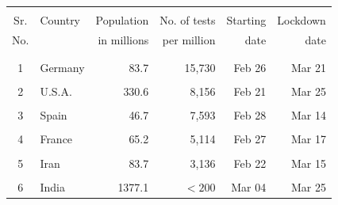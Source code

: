 \documentclass[aps,prd,10pt,twocolumn,nofootinbib]{revtex4-2}
\begin{document}
\begin{table}
\begin{tabular}
 {c l r r r r } 
\hline 
\hline
 &  &  &  &  &  \\ 
Sr.  & Country & Population & No. of tests & Starting  & Lockdown \\ 
No. &  & in millions & per million & date & date \\ 
 &  &  &  &  &  \\ 
\hline
\hline 
 &  &  &  &  &  \\ 
1 & Germany & 83.7 & 15,730 & Feb 26 & Mar 21  \\ 
 &  &  &  &  &  \\ 
2 & U.S.A. & 330.6 & 8,156 & Feb 21 & Mar 25  \\ 
 &  &  &  &  &  \\ 
3 & Spain & 46.7 & 7,593 & Feb 28 & Mar 14  \\ 
 &  &  &  &  &  \\ 
4 & France & 65.2 & 5,114 & Feb 27 & Mar 17  \\ 
 &  &  &  &  &  \\ 
5 & Iran & 83.7 & 3,136 & Feb 22 & Mar 15  \\ 
 &  &  &  &  &  \\ 
6 & India & 1377.1 & $< 200$ & Mar 04 & Mar 25  \\ 

\end{tabular}
\end{table}
\end{document}
